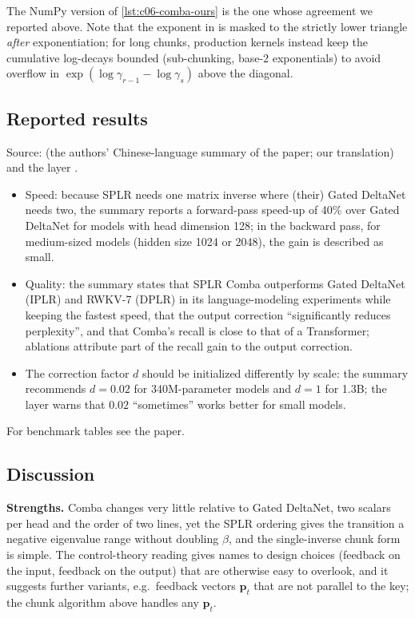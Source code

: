 The NumPy version of \cref{lst:c06-comba-ours} is the one whose agreement we reported above.
Note that the exponent in  is masked to the strictly lower triangle \emph{after}
exponentiation; for long chunks, production kernels instead keep the cumulative log-decays
bounded (sub-chunking, base-2 exponentials) to avoid overflow in
$\exp(\log\gamma_{r-1}-\log\gamma_s)$ above the diagonal.

\subsection{Reported results}

\begin{results}
Source:  (the authors'
Chinese-language summary of the paper; our translation) and the \fla{} layer
.
\begin{itemize}
\item Speed: because SPLR needs one matrix inverse where (their) Gated DeltaNet needs two,
the summary reports a forward-pass speed-up of 40\% over Gated DeltaNet for models with head
dimension 128; in the backward pass, for medium-sized models (hidden size 1024 or 2048), the
gain is described as small.
\item Quality: the summary states that SPLR Comba outperforms Gated DeltaNet (IPLR) and RWKV-7
(DPLR) in its language-modeling experiments while keeping the fastest speed, that the
output correction ``significantly reduces perplexity'', and that Comba's recall is close to
that of a Transformer; ablations attribute part of the recall gain to the output correction.
\item The correction factor $d$ should be initialized differently by scale: the summary
recommends $d=0.02$ for 340M-parameter models and $d=1$ for 1.3B; the \fla{} layer warns
that $0.02$ ``sometimes'' works better for small models.
\end{itemize}
For benchmark tables see the paper.
\end{results}

\subsection{Discussion}

\textbf{Strengths.} Comba changes very little relative to Gated DeltaNet, two scalars per
head and the order of two lines, yet the SPLR ordering gives the transition a negative
eigenvalue range without doubling $\beta$, and the single-inverse chunk form is simple. The
control-theory reading gives names to design choices (feedback on the input, feedback on
the output) that are otherwise easy to overlook, and it suggests further variants, e.g.\
feedback vectors $\bm{p}_t$ that are not parallel to the key; the chunk algorithm
above handles any $\bm{p}_t$.

